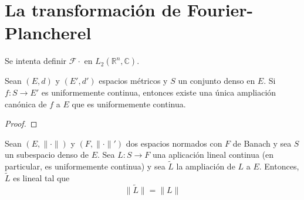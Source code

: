 \documentclass[12pt]{report}
\theoremstyle{largebreak}
\newcommand\cf[3]{\ensuremath{#1:#2\rightarrow#3}}
\newcommand\norm[1]{\ensuremath{\|#1\|}}
\newcommand{\fou}[1]{\ensuremath{\mathcal{F}#1}}
\begin{document}
    \section{La transformación de Fourier-Plancherel}

    Se intenta definir $\fou{\cdot}$ en $L_2(\mathbb{R}^n,\mathbb{C})$.

    \begin{theor}
        Sean $(E,d)$ y $(E',d')$ espacios métricos y $S$ un conjunto denso en $E$. Si $\cf{f}{S}{E'}$ es uniformemente continua, entonces existe una única ampliación canónica de $f$ a $E$ que es uniformemente continua.
    \end{theor}

    \begin{proof}
        
    \end{proof}

    \begin{propo}
        Sean $(E,\norm{\cdot})$ y $(F,\norm{\cdot}')$ dos espacios normados con $F$ de Banach y sea $S$ un subespacio denso de $E$. Sea $\cf{L}{S}{F}$ una aplicación lineal continua (en particular, es uniformemente continua) y sea $\tilde{L}$ la ampliación de $L$ a $E$. Entonces, $\tilde{L}$ es lineal tal que
        \begin{equation*}
            \norm{\tilde{L}}=\norm{L}
        \end{equation*}
    \end{propo}
\end{document}
